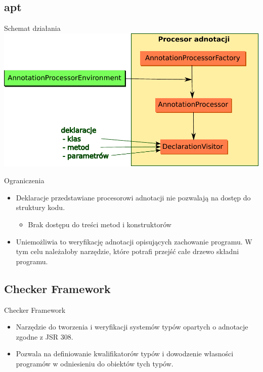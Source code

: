 \documentclass{beamer}
\begin{document}
\subsection{apt}

\begin{frame}{Schemat działania}
  \includegraphics[scale=0.55]{img/apt.pdf}
\end{frame}

\begin{frame}{Ograniczenia}
  \begin{itemize}
  \item Deklaracje przedstawiane procesorowi adnotacji 
    nie pozwalają na dostęp do struktury kodu.
    \begin{itemize}
    \item Brak dostępu do treści metod i konstruktorów
    \end{itemize}
  \item Uniemożliwia to weryfikację adnotacji opisujących zachowanie
    programu. W tym celu należałoby 
    narzędzie, które potrafi przejść całe drzewo składni programu.
  \end{itemize}
\end{frame}
    
\subsection{Checker Framework}

\begin{frame}{Checker Framework}
  \begin{itemize}
  \item Narzędzie do tworzenia i weryfikacji systemów typów 
    opartych o adnotacje zgodne z JSR 308.
  \item Pozwala na definiowanie kwalifikatorów typów i dowodzenie
    własności programów w odniesieniu do obiektów tych typów.
  \end{itemize}
\end{frame}
\end{document}
